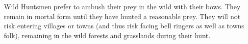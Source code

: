 Wild Huntsmen prefer to ambush their prey in the wild with their bows. They
remain in mortal form until they have hunted a reasonable prey. They will
not risk entering villages or towns (and thus risk facing bell ringers as well
as towns folk), remaining in the wild forests and grasslands during their
hunt.
